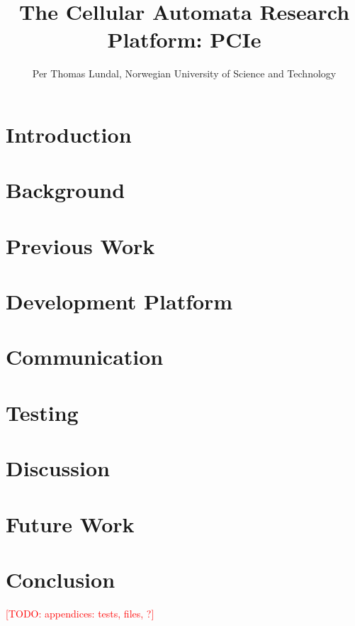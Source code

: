 \documentclass[a4paper]{IEEEtran}
\title{The Cellular Automata Research Platform: PCIe}
\author{Per Thomas Lundal, Norwegian University of Science and Technology}
\newcommand\todo[1]{\textcolor{red}{[TODO: #1]}}
\begin{document}
\maketitle

\begin{abstract}

    

\end{abstract}

\section{Introduction}

    

\section{Background}

    

\section{Previous Work}

    

\section{Development Platform}

    

\section{Communication}

    

\section{Testing}

    

\section{Discussion}

    

\section{Future Work}

    

\section{Conclusion}

    




\todo{appendices: tests, files, ?}
\end{document}
